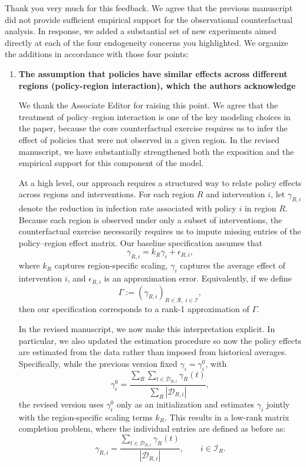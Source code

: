 \documentclass[letterpaper,twoside,11pt]{reviewresponse}
\begin{document}
Thank you very much for this feedback. We agree that the previous manuscript did not provide sufficient empirical support for the observational counterfactual analysis. In response, we added a substantial set of new experiments aimed directly at each of the four endogeneity concerns you highlighted. We organize the additions in accordance with those four points:
\begin{enumerate}
	\item \textbf{The assumption that policies have similar effects across different regions (policy-region interaction), which the authors acknowledge}
	
	We thank the Associate Editor for raising this point. We agree that the treatment of policy--region interaction is one of the key modeling choices in the paper, because the core counterfactual exercise requires us to infer the effect of policies that were not observed in a given region. In the revised manuscript, we have substantially strengthened both the exposition and the empirical support for this component of the model.

	\label{subsec:delphi}\label{app:separability}

	At a high level, our approach requires a structured way to relate policy effects across regions and interventions. For each region $R$ and intervention $i$, let $\gamma_{R,i}$ denote the reduction in infection rate associated with policy $i$ in region $R$. Because each region is observed under only a subset of interventions, the counterfactual exercise necessarily requires us to impute missing entries of the policy--region effect matrix. Our baseline specification assumes that
	\[
	\gamma_{R,i} = k_R \gamma_i + \epsilon_{R,i},
	\]
	where $k_R$ captures region-specific scaling, $\gamma_i$ captures the average effect of intervention $i$, and $\epsilon_{R,i}$ is an approximation error. Equivalently, if we define
	\[
	\Gamma := (\gamma_{R,i})_{R \in \mathcal{R},\; i \in \mathcal{I}},
	\]
	then our specification corresponds to a rank-1 approximation of $\Gamma$.
	
	In the revised manuscript, we now make this interpretation explicit. In particular, we also updated the estimation procedure so now the policy effects are estimated from the data rather than imposed from historical averages. Specifically, while the previous version fixed $\gamma_i=\gamma_i^0$, with
	\[
	\gamma_i^0 = \frac{\sum_{R} \sum_{t \in \mathcal{D}_{R,i}} \gamma_R(t)}{\sum_{R} |\mathcal{D}_{R,i}|},
	\]
	the revised version uses $\gamma_i^0$ only as an initialization and estimates $\gamma_i$ jointly with the region-specific scaling terms $k_R$. This results in a low-rank matrix completion problem, where the individual entries are defined as before as:
	\[
	\gamma_{R,i} = \frac{\sum_{t \in \mathcal{D}_{R,i}} \gamma_R(t)}{|\mathcal{D}_{R,i}|},
	\qquad i \in \mathcal{I}_R.
	\]
	

\end{enumerate}
\end{document}
